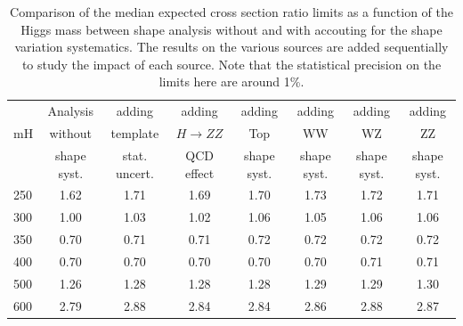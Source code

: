 \begin{table}[!ht]
\begin{center}
{\normalsize
\begin{tabular}{|l|c|cccccc|}
\hline
      &  Analysis    & adding          &  adding      &  adding      &  adding      & adding      & adding \\
mH  &  without     & template        &  $H\to ZZ$   &  Top         &  WW          & WZ          & ZZ \\
      &  shape syst. & stat. uncert.   &  QCD effect &  shape syst. &  shape syst. & shape syst. & shape syst. \\
\hline
250 & 1.62 & 1.71 & 1.69 & 1.70 & 1.73 & 1.72 & 1.71 \\   
300 & 1.00 & 1.03 & 1.02 & 1.06 & 1.05 & 1.06 & 1.06 \\ 
350 & 0.70 & 0.71 & 0.71 & 0.72 & 0.72 & 0.72 & 0.72 \\
400 & 0.70 & 0.70 & 0.70 & 0.70 & 0.70 & 0.71 & 0.71 \\
500 & 1.26 & 1.28 & 1.28 & 1.28 & 1.29 & 1.29 & 1.30 \\
600 & 2.79 & 2.88 & 2.84 & 2.84 & 2.86 & 2.88 & 2.87 \\
\hline
\end{tabular}
}
\caption{Comparison of the median expected cross section ratio limits as a function 
of the Higgs mass between shape analysis without and with accouting for the 
shape variation systematics. The results on the various sources are added sequentially 
to study the impact of each source. Note that the statistical precision on the limits 
here are around 1\%. }
\label{tab:mva_mtshape_detail}
\end{center}
\end{table}
